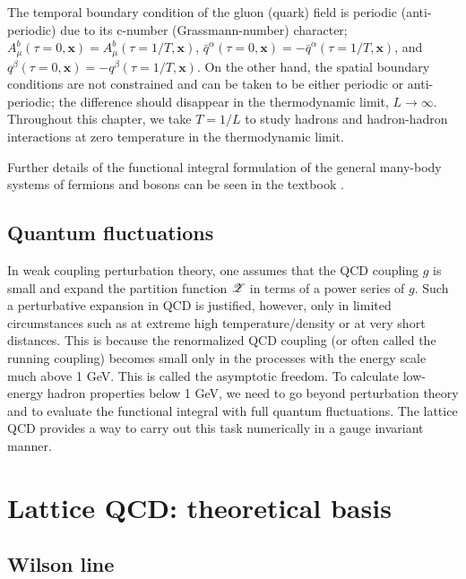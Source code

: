The temporal boundary condition of the gluon (quark) field is periodic (anti-periodic) due to its
c-number (Grassmann-number) character;  $A_{\mu}^b (\tau=0, \mathbf{x})=A_{\mu}^b (\tau=1/T, \mathbf{x})$,
$\bar{q}^{\alpha}(\tau=0,\mathbf{x})=-\bar{q}^{\alpha}(\tau=1/T,\mathbf{x})$, and 
$q^{\beta}(\tau=0,\mathbf{x})=-q^{\beta}(\tau=1/T,\mathbf{x})$.    On the other hand, the spatial boundary conditions are 
not constrained and can be taken to be either periodic or anti-periodic; the difference should disappear in the 
thermodynamic limit, $L \rightarrow \infty$.
 Throughout this chapter, we take $T = 1/L $   to
  study hadrons and hadron-hadron interactions at zero temperature in the thermodynamic limit.

Further details of the functional integral formulation of the general many-body systems of fermions and bosons
can be seen in the textbook \cite{Negele:1988vy}.

 \subsection{Quantum fluctuations}
In weak coupling perturbation theory, one assumes that the QCD coupling $g$  is small and expand the partition function
 ${\cal Z}$ in terms of a power series of $g$.  Such a perturbative expansion in QCD is justified, however, only in  limited 
 circumstances  such as at extreme high  temperature/density  or at very short distances. This is because  the 
  renormalized QCD coupling (or often called the running coupling) becomes small only in the processes 
  with the energy scale much above 1 GeV. This is called the asymptotic freedom.
 To calculate low-energy hadron properties below 1 GeV,
  we need to go beyond perturbation theory and to evaluate the functional integral with full quantum fluctuations.
 The lattice QCD provides a way to carry out this task numerically in a gauge invariant manner. 
 

  
\section{Lattice QCD: theoretical basis } 

\subsection{Wilson line}

